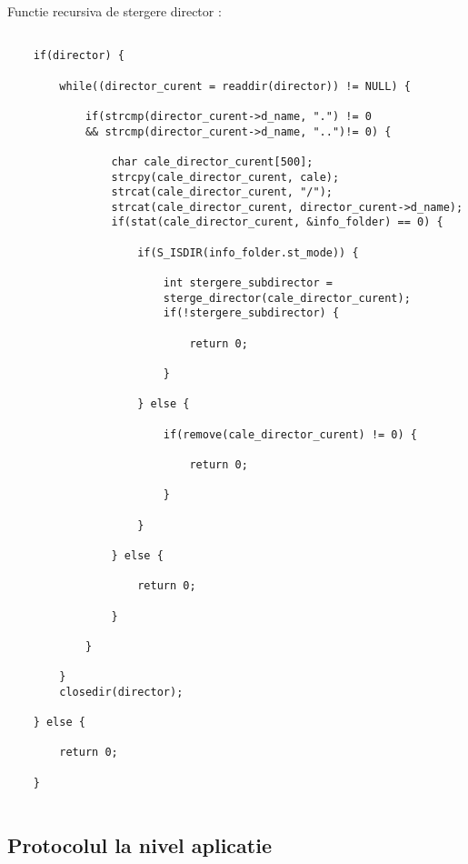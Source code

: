 \documentclass[runningheads]{llncs}
\begin{document}
Functie recursiva de stergere director :

\begin{verbatim}

    if(director) {

        while((director_curent = readdir(director)) != NULL) {

            if(strcmp(director_curent->d_name, ".") != 0 
            && strcmp(director_curent->d_name, "..")!= 0) {

                char cale_director_curent[500];
                strcpy(cale_director_curent, cale);
                strcat(cale_director_curent, "/");
                strcat(cale_director_curent, director_curent->d_name);
                if(stat(cale_director_curent, &info_folder) == 0) {

                    if(S_ISDIR(info_folder.st_mode)) {

                        int stergere_subdirector = 
                        sterge_director(cale_director_curent);                        
                        if(!stergere_subdirector) {

                            return 0;

                        }

                    } else {

                        if(remove(cale_director_curent) != 0) {

                            return 0;

                        }

                    }

                } else {

                    return 0;

                }
            
            }

        }
        closedir(director);

    } else {

        return 0;

    }
    
\end{verbatim}

\subsection{Protocolul la nivel aplicatie}
\end{document}
